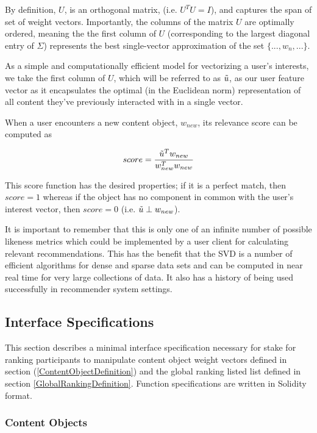 By definition, $U$, is an orthogonal matrix, (i.e. $U^TU = I$), and captures the span of set of weight vectors. Importantly, the columns of the matrix $U$ are optimally ordered, meaning the the first column of $U$ (corresponding to the largest diagonal entry of $\Sigma$) represents the best single-vector approximation of the set $\{..., w_n,...\}$. 

As a simple and computationally efficient model for vectorizing a user's interests, we take the first column of $U$, which will be referred to as $\Tilde{u}$, as our user feature vector as it encapsulates the optimal (in the Euclidean norm) representation of all content they've previously interacted with in a single vector.

When a user encounters a new content object, $w_{new}$, its relevance score can be computed as

\begin{equation}
    score = \frac{\Tilde{u}^Tw_{new}}{w_{new}^Tw_{new}}
\end{equation}

This score function has the desired properties; if it is a perfect match, then $score=1$ whereas if the object has no component in common with the user's interest vector, then $score = 0$ (i.e. $\Tilde{u} \perp w_{new}$).

It is important to remember that this is only one of an infinite number of possible likeness metrics which could be implemented by a user client for calculating relevant recommendations. This has the benefit that the SVD is a number of efficient algorithms for dense and sparse data sets and can be computed in near real time for very large collections of data. It also has a history of being used successfully in recommender system settings. 

\subsection{Interface Specifications}
\label{InterfaceDefinition}
This section describes a minimal interface specification necessary for stake for ranking participants to manipulate content object weight vectors defined in section (\ref{ContentObjectDefinition}) and the global ranking listed list defined in section \ref{GlobalRankingDefinition}. Function specifications are written in Solidity format.


\subsubsection{Content Objects}

